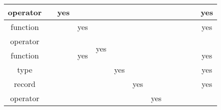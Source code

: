 \begin{table}[H]
{\begin{tabular}{|c|c|c|c|c|c|c|c|c|c|c|c|c|}
    \hline
    operator          &                          & yes                       &                                            &                      &                          &                          &                          &                          &                            &                          &                        & \cellcolor{lightgray}yes                   \\
    \hline
    function          &                          &                           & yes                                        &                      &                          &                          &                          &                          &                            &                          &                        & \cellcolor{lightgray}yes                   \\
    \hline
    operator          &                          &                           & \cellcolor{lightgray}                      & \multirow{2}{*}{yes} &                          &                          &                          &                          &                            &                          &                        & \cellcolor{lightgray}                      \\
    function          &                          &                           & \multirow{-2}{*}{\cellcolor{lightgray}yes} &                      &                          &                          &                          &                          &                            &                          &                        & \multirow{-2}{*}{\cellcolor{lightgray}yes}  \\
    \hline
    type              &                          &                           &                                            &                      & yes                      &                          &                          &                          &                            &                          &                        & \cellcolor{lightgray}yes                   \\
    \hline
    record            &                          &                           &                                            &                      &                          & yes                      &                          &                          &                            &                          &                        & \cellcolor{lightgray}yes                   \\
    \hline
    operator          &                          &                           &                                            &                      &                          &                          & \multirow{2}{*}{yes}     &                          &                            &                          &                        & \cellcolor{lightgray}                      \\

\end{tabular}}
\end{table}
